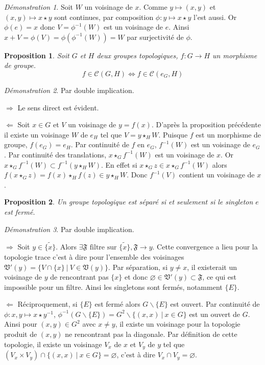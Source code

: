 \documentclass[a4paper, 11pt, french]{book}
\newenvironment{itemise}{\itemize}{\enditemize}
\theoremstyle{plain} %
\newtheorem{proposition}{Proposition}
\theoremstyle{definition} %
\theoremstyle{remark} %
\newtheorem*{demonstration}{Démonstration}
\renewcommand{\setminus}{\backslash}
\newcommand{\1}{\mathds{1}}
\newcommand\vide{\varnothing}
\newcommand{\inv}[1]{#1^{-1}}
\renewcommand{\cal}[1]{\mathcal{#1}}
\renewcommand{\frak}[1]{\mathfrak{#1}}
\newcommand\ens[2]{\{#1 \ |\ #2\}}
\newcommand\equivalence[3]{
	\begin{demonstration}
		#1
		\begin{itemise}
			\item[$\Longrightarrow$] #2
			\item[$\Longleftarrow$] #3
		\end{itemise}
	\end{demonstration}
}
\begin{document}
\begin{demonstration}
	Soit $W$ un voisinage de $x$.
	Comme $y\longmapsto(x, y)$ et $(x, y)\longmapsto x\star y$ sont continues, par composition $\phi:y\longmapsto x\star y$ l'est aussi.
	Or $\phi(e)=x$ donc $V=\inv{\phi}(W)$ est un voisinage de $e$.
	Ainsi $x+V=\phi(V)=\phi(\inv{\phi}(W))=W$ par surjectivité de $\phi$.
\end{demonstration}

\begin{proposition}
	Soit $G$ et $H$ deux groupes topologiques, $f:G\rightarrow H$ un morphisme de groupe.
	$$
		f\in\cal{C}(G, H)\iff f\in\cal{C}(e_G, H)
	$$
\end{proposition}

\equivalence{Par double implication.}{
	Le sens direct est évident.
}{
	Soit $x\in G$ et $V$ un voisinage de $y=f(x)$.
	D'après la proposition précédente il existe un voisinage $W$ de $e_H$ tel que $V=y\star_HW$.
	Puisque $f$ est un morphisme de groupe, $f(e_G)=e_H$.
	Par continuité de $f$ en $e_G$, $\inv{f}(W)$ est un voisinage de $e_G$.
	Par continuité des translations, $x\star_G\inv{f}(W)$ est un voisinage de $x$.
	Or $x\star_G\inv{f}(W)\subset\inv{f}(y\star_HW)$.
	En effet si $x\star_Gz\in x\star_G\inv{f}(W)$ alors $f(x\star_Gz)=f(x)\star_Hf(z)\in y\star_HW$.
	Donc $\inv{f}(V)$ contient un voisinage de $x$.
}

\begin{proposition}
	Un groupe topologique est séparé si et seulement si le singleton ${e}$ est fermé.
\end{proposition}

\equivalence{Par double implication.}{
	Soit $y\in\widetilde{\{x\}}$.
	Alors $\exists\frak{F}\text{ filtre sur $\widetilde{\{x\}}$}, \frak{F}\rightarrow y$.
	Cette convergence a lieu pour la topologie trace c'est à dire pour l'ensemble des voisinages $\frak{V}'(y)=\{V\cap\ens{x\}}{V\in\frak{V}(y)}$.
	Par séparation, si $y\neq x$, il existerait un voisinage de $y$ de rencontrant pas $\{x\}$ et donc $\vide\in\frak{V}'(y)\subset\frak{F}$, ce qui est impossible pour un filtre.
	Ainsi les singletons sont fermés, notamment $\{E\}$.
}{
	Réciproquement, si $\{E\}$ est fermé alors $G\setminus\{E\}$ est ouvert.
	Par continuité de $\phi:x, y\longmapsto x\star\inv{y}$, $\inv{\phi}(G\setminus\{E\})=G^2\setminus\ens{(x, x)}{x\in G}$ est un ouvert de $G$.
	Ainsi pour $(x, y)\in G^2$ avec $x\neq y$, il existe un voisinage pour la topologie produit de $(x, y)$ ne rencontrant pas la diagonale.
	Par définition de cette topologie, il existe un voisinage $V_x$ de $x$ et $V_y$ de $y$ tel que $(V_x\times V_y)\cap\ens{(x, x)}{x\in G}=\vide$, c'est à dire $V_x\cap V_y=\vide$.
}
\end{document}

